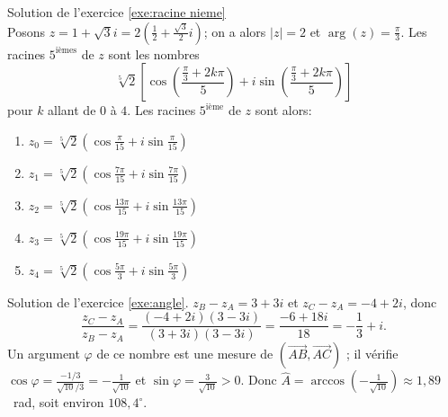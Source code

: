 \begin{corrige}
\begin{sol}
\label{sol:racine nieme}
Solution de l'exercice \ref{exe:racine nieme} \\
Posons $z = 1 + \sqrt{3} i = 2 \left( \frac{1}{2} + \frac{\sqrt{3}}{2} i \right)$; on a alors $|z| = 2$ et $\arg(z) = \frac{\pi}{3}$.
Les racines $5^{\text{i\`emes}}$ de $z$ sont les nombres 
$$
\sqrt[5]{2}  \left[ \cos \left( \frac{ \frac{\pi }{3} + 2k\pi}{5} \right) + i \sin \left( \frac{ \frac{\pi }{3} + 2k\pi}{5} \right) \right] 
$$ 
pour $k$ allant de $0$ \`a $4$.
Les racines $5^{\text{i\`eme}}$ de $z$ sont alors: 
\begin{enumerate}
\item $ z_0 = \sqrt[5]{2} \left( \cos \frac{\pi}{15} + i \sin \frac{\pi}{15} \right)         $
\item $ z_1 = \sqrt[5]{2} \left( \cos \frac{7 \pi}{15} + i \sin \frac{7 \pi}{15} \right)     $
\item $ z_2 = \sqrt[5]{2} \left( \cos \frac{13 \pi}{15} + i \sin \frac{13 \pi}{15} \right)   $
\item $ z_3 = \sqrt[5]{2} \left( \cos \frac{19 \pi}{15} + i \sin \frac{19 \pi}{15} \right)   $
\item $ z_4 = \sqrt[5]{2} \left( \cos \frac{5 \pi}{3} + i \sin \frac{5 \pi}{3} \right)       $
\end{enumerate}
\end{sol}
\begin{sol}
Solution de l'exercice \ref{exe:angle}.
$z_B - z_A = 3 + 3i$ et $z_C - z_A = -4 + 2i$, donc
\[
\frac{z_C - z_A}{z_B - z_A} = \frac{(-4+2i)(3-3i)}{(3+3i)(3-3i)} = \frac{-6 + 18i}{18} = -\frac{1}{3} + i .
\]
Un argument $\varphi$ de ce nombre est une mesure de $\left(\overrightarrow{AB},\overrightarrow{AC}\right)$ ; il v\'erifie
$\cos\varphi = \frac{-1/3}{\sqrt{10}/3} = -\frac{1}{\sqrt{10}}$ et $\sin\varphi = \frac{3}{\sqrt{10}} > 0$.
Donc $\hat{A} = \arccos\left(-\frac{1}{\sqrt{10}}\right) \approx 1{,}89$~rad, soit environ $108{,}4^\circ$.

\end{sol}
\end{corrige}
